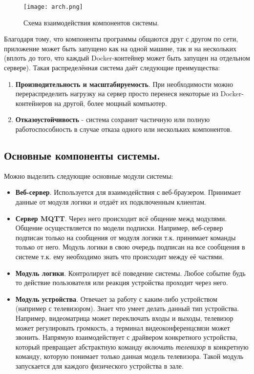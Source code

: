 \begin{figure}[h]
    \centering
    \texttt{[image: arch.png]}
    \caption{Схема взаимодействия компонентов системы.}
    \label{fig:arch}
\end{figure}

\noindent Благодаря тому, что компоненты программы общаются друг с другом по сети, приложение может быть запущено как
на одной машине, так и на нескольких (вплоть до того, что каждый Docker-контейнер может быть запущен на отдельном сервере).
Такая распределённая система даёт следующие преимущества:
\begin{enumerate}
    \item \textbf{Производительность и масштабируемость}. При необходимости можно перераспределить нагрузку на сервер
    просто перенеся некоторые из Docker-контейнеров на другой, более мощный компьютер.
    \item \textbf{Отказоустойчивость} - система сохранит частичную или полную работоспособность в случае отказа одного
    или нескольких компонентов.
\end{enumerate}

\subsection{Основные компоненты системы.}

Можно выделить следующие основные модули системы:

\begin{itemize}
    \item \textbf{Веб-сервер}. Используется для взаимодействия с веб-браузером. Принимает данные от модуля логики и отдаёт
    их подключенным клиентам.
    \item \textbf{Сервер MQTT}. Через него происходит всё общение межд модулями. Общение осуществляется по модели подписки.
    Например, веб-сервер подписан только на сообщения от модуля логики т.к. принимает команды только от него. Модуль
    логики в свою очередь подписан на все сообщения в системе т.к. ему необходимо знать что происходит между её частями.
    \item \textbf{Модуль логики}. Контролирует всё поведение системы. Любое событие будь то действие пользователя или реакция
    устройства проходит через него.
    \item \textbf{Модуль устройства}. Отвечает за работу с каким-либо устройством (например с телевизором). Знает что умеет
    делать данный тип устройства. Например, видеоматрица может переключать входы и выходы, телевизор может регулировать
    громкость, а терминал видеоконференцсвязи может звонить. Напрямую взаимодействует с драйвером конкретного устройства,
    который превращает абстрактную команду \textit{включить телевизор} в конкретную команду, которую понимает только данная
    модель телевизора. Такой модуль запускается для каждого физического устройства в зале.
\end{itemize}

